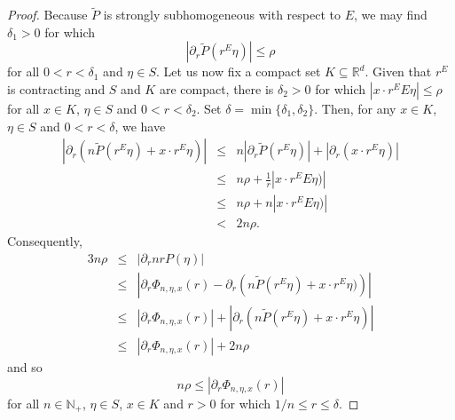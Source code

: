 \documentclass[11pt]{article}
\begin{document}
\begin{proof}
Because $\widetilde{P}$ is strongly subhomogeneous with respect to $E$, we may find $\delta_1>0$ for which
\begin{equation*}
    |\partial_r\widetilde{P}(r^E\eta)|\leq \rho
\end{equation*}
for all $0<r<\delta_1$ and $\eta\in S$. Let us now fix a compact set $K\subseteq \mathbb{R}^d$. Given that $r^E$ is contracting and $S$ and $K$ are compact, there is $\delta_2>0$ for which $|x\cdot r^E E\eta|\leq \rho$ for all $x\in K$, $\eta\in S$ and $0<r<\delta_2$. Set $\delta=\min\{\delta_1,\delta_2\}$. Then, for any $x\in K$, $\eta\in S$ and $0<r<\delta$, we have
\begin{eqnarray*}
\left|\partial_r
\left(
n\widetilde{P}
(r^E\eta)
+x\cdot r^E\eta
\right)
\right|
&\leq &
n\left|
\partial_r\widetilde{P}(r^E\eta)
\right|
+\left|\partial_r\left(x\cdot r^E\eta\right)\right|\\
&\leq& n\rho+ \frac{1}{r}|x\cdot r^E E\eta)|\\
&\leq& n\rho +n|x\cdot r^E E\eta)|\\
&<&2n\rho.
\end{eqnarray*}
Consequently,
\begin{eqnarray*}
    3n\rho&\leq& |\partial_r nrP(\eta)|\\
    &\leq& \left|\partial_r\Phi_{n,\eta,x}(r)-\partial_r\left(n\widetilde{P}(r^E\eta)+x \cdot r^E\eta)\right)\right|\\
    &\leq& \left|\partial_r \Phi_{n,\eta,x}(r)
    \right|+\left|\partial_r
\left(n\widetilde{P}(r^E\eta)+x\cdot r^E\eta\right)\right|\\
&\leq &|\partial_r \Phi_{n,\eta,x}(r)|+2n\rho
\end{eqnarray*}
and so
\begin{equation*}
    n\rho\leq |\partial_r \Phi_{n,\eta,x}(r)|
\end{equation*}
for all $n\in\mathbb{N}_+$, $\eta\in S$, $x\in K$ and $r>0$ for which $1/n\leq r\leq \delta$.
\end{proof}
\end{document}
